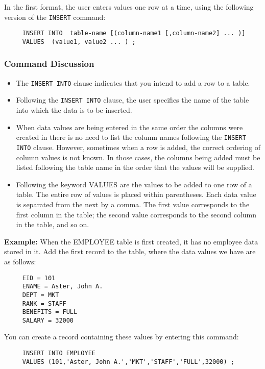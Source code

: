 In the first format, the user enters values one row at a time, using
the following version of the \verb`INSERT` command:

\begin{verbatim}
     INSERT INTO  table-name [(column-name1 [,column-name2] ... )]
     VALUES  (value1, value2 ... ) ;
\end{verbatim}


\subsubsection{Command Discussion}

\begin{itemize}
\item The {\tt INSERT INTO} clause indicates that you intend to add a row to
a table.

\item Following the {\tt INSERT INTO} clause, the user specifies the name of
the table into which the data is to be inserted.

\item When data values are being entered in the same order the
columns were created in
there is no need to list the column names following the {\tt INSERT INTO}
clause.  However, sometimes when a row is added, the correct ordering of
column values is not known.  In those cases, the columns
being added must be listed following the table name in the order that
the values will be supplied.

\item Following the keyword VALUES are the values to be added to one
row of a table.  The entire row of values is placed within
parentheses.  Each data value is separated from the next by a comma.
The first value corresponds to the first column in the table; the
second value corresponds to the second column in the table, and so on.
\end{itemize}

{\bf Example:}
When the EMPLOYEE table is first created, it has no employee data
stored in it.  Add the first record to the table, where the data
values we have are as follows:
\begin{verbatim}
     EID = 101
     ENAME = Aster, John A.
     DEPT = MKT
     RANK = STAFF
     BENEFITS = FULL
     SALARY = 32000
\end{verbatim}
You can create a record containing these values by entering this
command:
\begin{verbatim}
     INSERT INTO EMPLOYEE
     VALUES (101,'Aster, John A.','MKT','STAFF','FULL',32000) ;
\end{verbatim}


